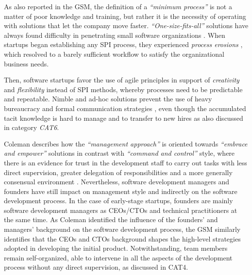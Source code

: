 \documentclass[10pt,journal,letterpaper,compsoc]{IEEEtran}
\begin{document}
As also reported in the GSM, the definition of a \textit{``minimum process''} 
is not a matter of poor knowledge and training, but rather it is the necessity 
of operating with solutions that let the company move faster. 
\textit{``One-size-fits-all''} solutions have always found difficulty in 
penetrating small software organizations \cite{Staples2007}. When startups began 
establishing any SPI process, they experienced \textit{process erosions} \cite{Coleman2008} %
, which resolved to a barely sufficient workflow to satisfy the organizational 
business needs.

Then, software startups favor the use of agile principles in support of 
\textit{creativity} and \textit{flexibility} instead of SPI methods, whereby 
processes need to be predictable and repeatable. Nimble and ad-hoc solutions 
prevent the use of heavy bureaucracy and formal communication strategies %
, even though the accumulated tacit knowledge is hard to manage and to transfer 
to new hires as also discussed in category \textit{CAT6}.

Coleman describes how the \textit{``management approach''} is oriented towards 
\textit{``embrace and empower''} solutions in contrast with \textit{``command 
and control''} style, where there is an evidence for trust in the  development 
staff to carry out tasks with less direct supervision, greater delegation of 
responsibilities and a more generally consensual environment \cite{Coleman2008}. 
Nevertheless, software development managers and founders have still impact on 
management style and indirectly on the software development process. In the case 
of early-stage startups, founders are mainly software development managers as 
CEOs/CTOs and  technical practitioners at the same time. As Coleman identified 
the influence of the founders' and managers' background on the software 
development process, the GSM similarly identifies that the CEOs and CTOs 
background shapes the high-level strategies adopted in developing the initial 
product. Notwithstanding, team members remain self-organized, able to intervene 
in all the aspects of the development process without any direct supervision, as 
discussed in CAT4.
\end{document}
